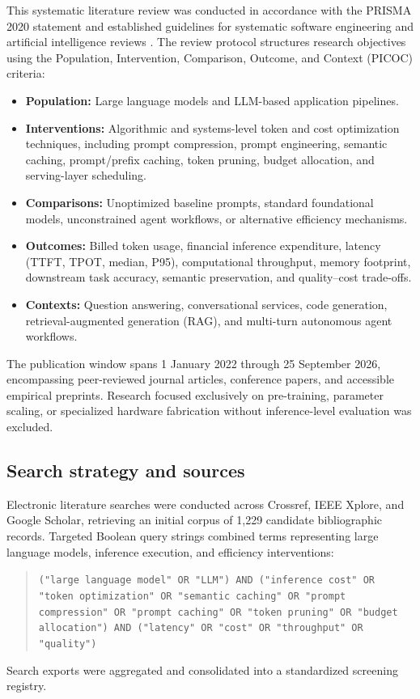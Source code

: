 \IfFileExists{jair.cls}{\documentclass{jair}}{\documentclass[manuscript,nonacm,screen]{acmart}}
\begin{document}
This systematic literature review was conducted in accordance with the PRISMA 2020 statement \cite{PRISMA} and established guidelines for systematic software engineering and artificial intelligence reviews \cite{Kitchenham}. The review protocol structures research objectives using the Population, Intervention, Comparison, Outcome, and Context (PICOC) criteria:
\begin{itemize}[leftmargin=1.5em]
\item \textbf{Population:} Large language models and LLM-based application pipelines.
\item \textbf{Interventions:} Algorithmic and systems-level token and cost optimization techniques, including prompt compression, prompt engineering, semantic caching, prompt/prefix caching, token pruning, budget allocation, and serving-layer scheduling.
\item \textbf{Comparisons:} Unoptimized baseline prompts, standard foundational models, unconstrained agent workflows, or alternative efficiency mechanisms.
\item \textbf{Outcomes:} Billed token usage, financial inference expenditure, latency (TTFT, TPOT, median, P95), computational throughput, memory footprint, downstream task accuracy, semantic preservation, and quality--cost trade-offs.
\item \textbf{Contexts:} Question answering, conversational services, code generation, retrieval-augmented generation (RAG), and multi-turn autonomous agent workflows.
\end{itemize}

The publication window spans 1 January 2022 through 25 September 2026, encompassing peer-reviewed journal articles, conference papers, and accessible empirical preprints. Research focused exclusively on pre-training, parameter scaling, or specialized hardware fabrication without inference-level evaluation was excluded.

\subsection{Search strategy and sources}

Electronic literature searches were conducted across Crossref, IEEE Xplore, and Google Scholar, retrieving an initial corpus of 1,229 candidate bibliographic records. Targeted Boolean query strings combined terms representing large language models, inference execution, and efficiency interventions:
\begin{quote}
\small
\texttt{("large language model" OR "LLM") AND ("inference cost" OR "token optimization" OR "semantic caching" OR "prompt compression" OR "prompt caching" OR "token pruning" OR "budget allocation") AND ("latency" OR "cost" OR "throughput" OR "quality")}
\end{quote}
Search exports were aggregated and consolidated into a standardized screening registry.
\end{document}
